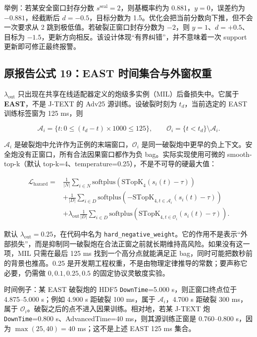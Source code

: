 \documentclass[11pt,a4paper]{article}
\newcommand{\code}[1]{\texttt{\small #1}}
\begin{document}
举例：若某安全窗口封存分数 \(s^{\mathrm{seal}}=2\)，则基概率约为 0.881，\(y=0\)，误差约为 \(-0.881\)，经截断后 \(d=-0.5\)，目标分数为 1.5。优化会把当前分数向下推，但不会一次要求从 2 跳到极低值。若破裂正窗口封存分数为 \(-2\)，则 \(y=1\)、\(d=+0.5\)、目标为 \(-1.5\)，更新方向相反。该设计体现“有界纠错”，并不意味着一次 support 更新即可修正最终报警。

\subsection{原报告公式 19：EAST 时间集合与外窗权重}

\(\lambda_{\mathrm{out}}\) 只出现在共享在线适配器定义的炮级多实例（MIL）后备损失中。它属于 \textbf{EAST}，不是 J-TEXT 的 Adv25 源训练。设破裂时刻为 \(t_d\)，当前选定的 EAST 训练标签窗为 125 ms，则

\[
\mathcal{A}_i=\{t:0\leq(t_d-t)\times1000\leq125\},
\qquad
\mathcal{O}_i=\{t<t_d\}\setminus\mathcal{A}_i.
\]

\(\mathcal{A}_i\) 是破裂炮中允许作为正例的末端窗口，\(\mathcal{O}_i\) 是同一破裂炮中更早的负上下文。安全炮没有正窗口，所有合法因果窗口都作为负 bag。实际实现使用可微的 smooth-top-k（默认 top-k=4、temperature=0.25），不是不可导的硬最大值：

\begin{equation}
\begin{aligned}
\mathcal{L}_{\mathrm{hazard}}
={}&\frac{1}{|N|}\sum_{i\in N}
\mathrm{softplus}\!\left(\mathrm{STopK}_{4}(s_i(t)-\tau)\right)\\
&+\frac{1}{|D|}\sum_{i\in D}
\mathrm{softplus}\!\left(-\mathrm{STopK}_{4,t\in\mathcal{A}_i}(s_i(t)-\tau)\right)\\
&+\lambda_{\mathrm{out}}\frac{1}{|D|}\sum_{i\in D}
\mathrm{softplus}\!\left(\mathrm{STopK}_{4,t\in\mathcal{O}_i}(s_i(t)-\tau)\right).
\end{aligned}
\label{eq:hazard-mil}
\end{equation}

默认 \(\lambda_{\mathrm{out}}=0.25\)，在代码中名为 \code{hard\_negative\_weight}。它的作用不是表示“外部损失”，而是抑制同一破裂炮在合法正窗之前就长期维持高风险。如果没有这一项，MIL 只需在最后 125 ms 找到一个高分点就能满足正 bag，同时可能把数秒前的背景也推高。0.25 是开发期工程权重，不是由物理定律推导的常数；要声称它必要，仍需做 \(0,0.1,0.25,0.5\) 的固定协议灵敏度实验。

时间例子：某 EAST 破裂炮的 HDF5 \code{DownTime}=5.000 s，则正窗口终点位于 4.875--5.000 s；例如 4.900 s 距破裂 100 ms，属于 \(\mathcal{A}_i\)，4.700 s 距破裂 300 ms，属于 \(\mathcal{O}_i\)。破裂之后的点不进入因果训练。相对地，若某 J-TEXT 炮 \code{DownTime}=0.800 s、AdvancedTime=40 ms，则其源训练正窗是 0.760--0.800 s，因为 \(\max(25,40)=40\) ms；这不是上述 EAST 125 ms 集合。
\end{document}
